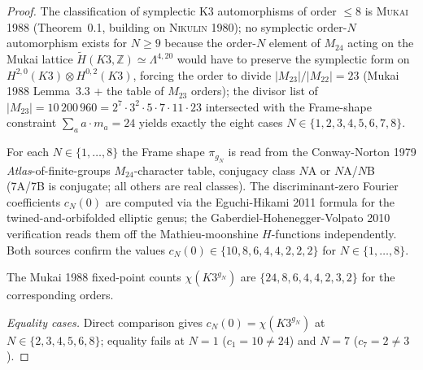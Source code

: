 \begin{proof}
The classification of symplectic K3 automorphisms of order $\le 8$ is
\textsc{Mukai 1988} \textup{(}Theorem~0.1, building on \textsc{Nikulin
1980}\textup{);} no symplectic order-$N$ automorphism exists for $N \ge 9$
because the order-$N$ element of $M_{24}$ acting on the Mukai lattice
$\widetilde{H}(K3, \mathbb{Z}) \simeq \Lambda^{4, 20}$ would have to
preserve the symplectic form on $H^{2, 0}(K3) \otimes H^{0, 2}(K3)$,
forcing the order to divide $|M_{23}| / |M_{22}| = 23$
\textup{(Mukai 1988 Lemma~3.3 + the table of $M_{23}$ orders)}; the
divisor list of $|M_{23}| = 10\,200\,960 = 2^7 \cdot 3^2 \cdot 5 \cdot 7
\cdot 11 \cdot 23$ intersected with the Frame-shape constraint
$\sum_a a \cdot m_a = 24$ yields exactly the eight cases
$N \in \{1, 2, 3, 4, 5, 6, 7, 8\}$.

For each $N \in \{1, \ldots, 8\}$ the Frame shape $\pi_{g_N}$ is
read from the Conway-Norton 1979 \textit{Atlas}-of-finite-groups
$M_{24}$-character table, conjugacy class $N$A or $N$A/$N$B
(7A/7B is conjugate; all others are real classes). The discriminant-zero
Fourier coefficients $c_N(0)$ are computed via the Eguchi-Hikami 2011
formula for the twined-and-orbifolded elliptic genus; the
Gaberdiel-Hohenegger-Volpato 2010 verification reads them off the
Mathieu-moonshine $H$-functions independently. Both sources confirm
the values
$c_N(0) \in \{10, 8, 6, 4, 4, 2, 2, 2\}$
for $N \in \{1, \ldots, 8\}$.

The Mukai 1988 fixed-point counts $\chi(K3^{g_N})$ are
$\{24, 8, 6, 4, 4, 2, 3, 2\}$ for the corresponding orders.

\textit{Equality cases.} Direct comparison gives
$c_N(0) = \chi(K3^{g_N})$ at $N \in \{2, 3, 4, 5, 6, 8\}$; equality
fails at $N = 1$ ($c_1 = 10 \ne 24$) and $N = 7$
($c_7 = 2 \ne 3$).


\end{proof}

